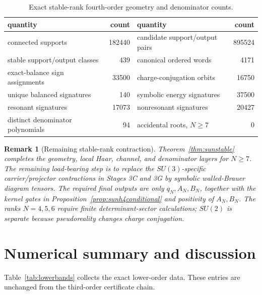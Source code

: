\documentclass[11pt]{article}
\newtheorem{remark}[theorem]{Remark}
\begin{document}
\begin{table}[t]
\centering
\small
\begin{tabular}{lr@{\qquad}lr}
\toprule
quantity & count & quantity & count \\
\midrule
connected supports & 182440 & candidate support/output pairs & 895524 \\
stable support/output classes & 439 & canonical ordered words & 4171 \\
exact-balance sign assignments & 33500 & charge-conjugation orbits & 16750 \\
unique balanced signatures & 140 & symbolic energy signatures & 37500 \\
resonant signatures & 17073 & nonresonant signatures & 20427 \\
distinct denominator polynomials & 94 & accidental roots, $N\geq7$ & 0 \\
\bottomrule
\end{tabular}
\caption{Exact stable-rank fourth-order geometry and denominator counts.}
\label{tab:sunstable}
\end{table}

\begin{remark}[Remaining stable-rank contraction]
Theorem~\ref{thm:sunstable} completes the geometry, local Haar, channel, and
denominator layers for $N\geq7$. The remaining load-bearing step is to replace
the $SU(3)$-specific carrier/projector contractions in Stages 3C and 3G by
symbolic walled-Brauer diagram tensors. The required final outputs are only
$q_N,A_N,B_N$, together with the kernel gates in
Proposition~\ref{prop:sunh4conditional} and positivity of $A_N,B_N$.
The ranks $N=4,5,6$ require finite determinant-sector calculations; $SU(2)$
is separate because pseudoreality changes charge conjugation.
\end{remark}

\section{Numerical summary and discussion}
\label{sec:numbers}

Table~\ref{tab:lowerbands} collects the exact lower-order data. These entries
are unchanged from the third-order certificate chain.
\end{document}
